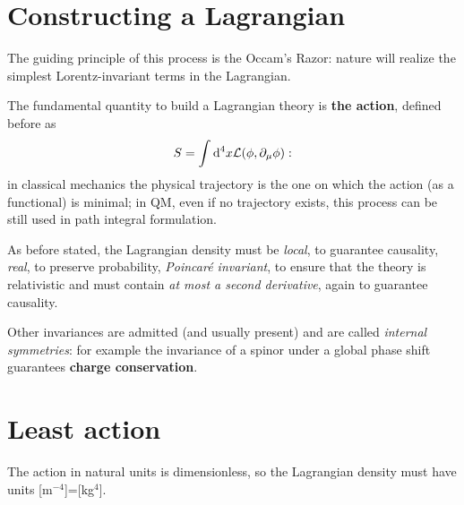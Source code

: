 \section{Constructing a Lagrangian}
The guiding principle of this process is the Occam's Razor: nature will realize
the simplest Lorentz-invariant terms in the Lagrangian.

The fundamental quantity to build a Lagrangian theory is \textbf{the action}, defined
before as
$$S = \int\dd^4x\mathcal{L}(\phi,\partial_\mu\phi):$$
in classical mechanics the physical trajectory is the one on which the action (as a 
functional) is minimal; in QM, even if no trajectory exists, this process can be still
used in path integral formulation.

As before stated, the Lagrangian density must be \textit{local}, to guarantee
causality, \textit{real}, to preserve probability, \textit{Poincaré 
invariant}, to ensure that the theory is relativistic and must contain \textit{at
most a second derivative}, again to guarantee causality.

Other invariances are admitted (and usually present) and are called \textit{internal
symmetries}: for example the invariance of a spinor under a global phase shift
guarantees \textbf{charge conservation}.
\section{Least action}
The action in natural units is dimensionless, so the Lagrangian density must have
units [m$^{-4}$]=[kg$^4$].

